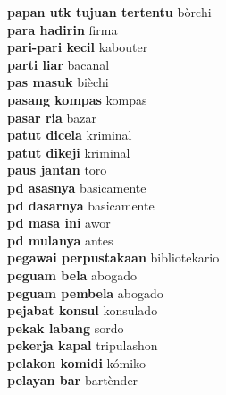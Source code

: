 \textbf{ papan utk tujuan tertentu  } bòrchi \\
\textbf{ para hadirin  } firma \\
\textbf{ pari-pari kecil  } kabouter \\
\textbf{ parti liar  } bacanal \\
\textbf{ pas masuk  } bièchi \\
\textbf{ pasang kompas  } kompas \\
\textbf{ pasar ria  } bazar \\
\textbf{ patut dicela  } kriminal \\
\textbf{ patut dikeji  } kriminal \\
\textbf{ paus jantan  } toro \\
\textbf{ pd asasnya  } basicamente \\
\textbf{ pd dasarnya  } basicamente \\
\textbf{ pd masa ini  } awor \\
\textbf{ pd mulanya  } antes \\
\textbf{ pegawai perpustakaan  } bibliotekario \\
\textbf{ peguam bela  } abogado \\
\textbf{ peguam pembela  } abogado \\
\textbf{ pejabat konsul  } konsulado \\
\textbf{ pekak labang  } sordo \\
\textbf{ pekerja kapal  } tripulashon \\
\textbf{ pelakon komidi  } kómiko \\
\textbf{ pelayan bar  } bartènder \\
